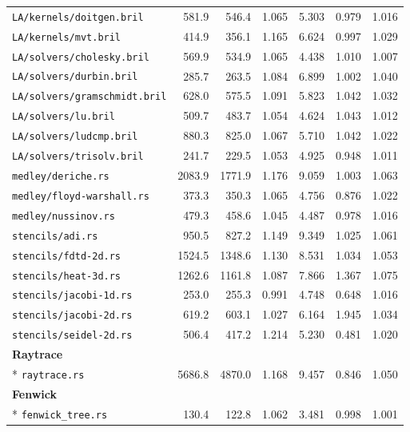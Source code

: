\begin{longtable}{p{52mm}rrrrrr}
\nolinkurl{LA/kernels/doitgen.bril} & 581.9 & 546.4 & 1.065 & 5.303 & 0.979 & 1.016 \\
\nolinkurl{LA/kernels/mvt.bril} & 414.9 & 356.1 & 1.165 & 6.624 & 0.997 & 1.029 \\
\nolinkurl{LA/solvers/cholesky.bril} & 569.9 & 534.9 & 1.065 & 4.438 & 1.010 & 1.007 \\
\nolinkurl{LA/solvers/durbin.bril} & 285.7 & 263.5 & 1.084 & 6.899 & 1.002 & 1.040 \\
\nolinkurl{LA/solvers/gramschmidt.bril} & 628.0 & 575.5 & 1.091 & 5.823 & 1.042 & 1.032 \\
\nolinkurl{LA/solvers/lu.bril} & 509.7 & 483.7 & 1.054 & 4.624 & 1.043 & 1.012 \\
\nolinkurl{LA/solvers/ludcmp.bril} & 880.3 & 825.0 & 1.067 & 5.710 & 1.042 & 1.022 \\
\nolinkurl{LA/solvers/trisolv.bril} & 241.7 & 229.5 & 1.053 & 4.925 & 0.948 & 1.011 \\
\nolinkurl{medley/deriche.rs} & 2083.9 & 1771.9 & 1.176 & 9.059 & 1.003 & 1.063 \\
\nolinkurl{medley/floyd-warshall.rs} & 373.3 & 350.3 & 1.065 & 4.756 & 0.876 & 1.022 \\
\nolinkurl{medley/nussinov.rs} & 479.3 & 458.6 & 1.045 & 4.487 & 0.978 & 1.016 \\
\nolinkurl{stencils/adi.rs} & 950.5 & 827.2 & 1.149 & 9.349 & 1.025 & 1.061 \\
\nolinkurl{stencils/fdtd-2d.rs} & 1524.5 & 1348.6 & 1.130 & 8.531 & 1.034 & 1.053 \\
\nolinkurl{stencils/heat-3d.rs} & 1262.6 & 1161.8 & 1.087 & 7.866 & 1.367 & 1.075 \\
\nolinkurl{stencils/jacobi-1d.rs} & 253.0 & 255.3 & 0.991 & 4.748 & 0.648 & 1.016 \\
\nolinkurl{stencils/jacobi-2d.rs} & 619.2 & 603.1 & 1.027 & 6.164 & 1.945 & 1.034 \\
\nolinkurl{stencils/seidel-2d.rs} & 506.4 & 417.2 & 1.214 & 5.230 & 0.481 & 1.020 \\
\multicolumn{7}{l}{\textbf{Raytrace}}\\*
\nolinkurl{raytrace.rs} & 5686.8 & 4870.0 & 1.168 & 9.457 & 0.846 & 1.050 \\
\multicolumn{7}{l}{\textbf{Fenwick}}\\*
\nolinkurl{fenwick_tree.rs} & 130.4 & 122.8 & 1.062 & 3.481 & 0.998 & 1.001 \\
\end{longtable}\endgroup
